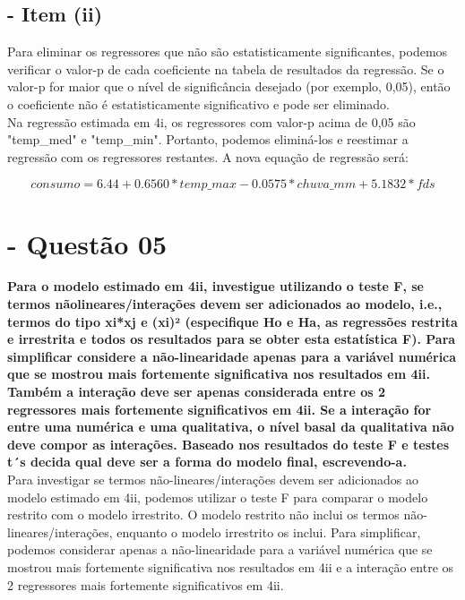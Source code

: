\documentclass[a4paper, 12pt]{article}
\begin{document}
\subsection{- Item (ii)}

Para eliminar os regressores que não são estatisticamente significantes, podemos verificar o valor-p de cada coeficiente na tabela de resultados da regressão. Se o valor-p for maior que o nível de significância desejado (por exemplo, 0,05), então o coeficiente não é estatisticamente significativo e pode ser eliminado.\\

Na regressão estimada em 4i, os regressores com valor-p acima de 0,05 são "temp\_med" e "temp\_min". Portanto, podemos eliminá-los e reestimar a regressão com os regressores restantes. A nova equação de regressão será:

\begin{equation}
    consumo = 6.44 + 0.6560*temp\_max - 0.0575*chuva\_mm + 5.1832*fds
\end{equation}


\section{- Questão 05}
\textbf{Para o modelo estimado em 4ii, investigue utilizando o teste F, se termos nãolineares/interações devem ser adicionados ao modelo, i.e., termos do tipo xi*xj e (xi)²
(especifique Ho e Ha, as regressões restrita e irrestrita e todos os resultados para se obter esta estatística F). Para simplificar considere a não-linearidade apenas para a variável numérica que se mostrou mais fortemente significativa nos resultados em 4ii. Também a interação deve ser apenas considerada entre os 2 regressores mais fortemente significativos em 4ii. Se a interação for entre uma numérica e uma qualitativa, o nível basal da qualitativa não deve compor as interações. Baseado nos resultados do teste F e testes t´s decida qual deve ser a forma do modelo final, escrevendo-a.
}\\ 

Para investigar se termos não-lineares/interações devem ser adicionados ao modelo estimado em 4ii, podemos utilizar o teste F para comparar o modelo restrito com o modelo irrestrito. O modelo restrito não inclui os termos não-lineares/interações, enquanto o modelo irrestrito os inclui. Para simplificar, podemos considerar apenas a não-linearidade para a variável numérica que se mostrou mais fortemente significativa nos resultados em 4ii e a interação entre os 2 regressores mais fortemente significativos em 4ii.\\
\end{document}
